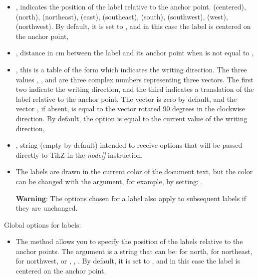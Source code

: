 \begin{itemize}
\begin{itemize}
    \begin{itemize}
        \item {}, indicates the position of the label relative to the anchor point.  (centered),  (north),  (northeast),  (east),  (southeast),  (south),  (southwest),  (west),  (northwest). By default, it is set to , and in this case the label is centered on the anchor point,
        \item {}, distance in cm between the label and its anchor point when  is not equal to ,
        \item {}, this is a table of the form  which indicates the writing direction. The three values ​​, , and  are three complex numbers representing three vectors. The first two indicate the writing direction, and the third indicates a translation of the label relative to the anchor point. The vector  is zero by default, and the vector , if absent, is equal to the vector  rotated 90 degrees in the clockwise direction. By default, the  option is equal to the current value of the writing direction,
        \item {}, string (empty by default) intended to receive options that will be passed directly to TikZ in the \emph{node[]} instruction.
        \item The labels are drawn in the current color of the document text, but the color can be changed with the  argument, for example, by setting: .

    \textbf{Warning}: The options chosen for a label also apply to subsequent labels if they are unchanged.
    \end{itemize}
\end{itemize}

Global options for labels:

\begin{itemize}
    \item The  method allows you to specify the position of the labels relative to the anchor points. The  argument is a string that can be:  for north,  for northeast,  for northwest, or , , . By default, it is set to , and in this case the label is centered on the anchor point.
    

\end{itemize}
\end{itemize}
